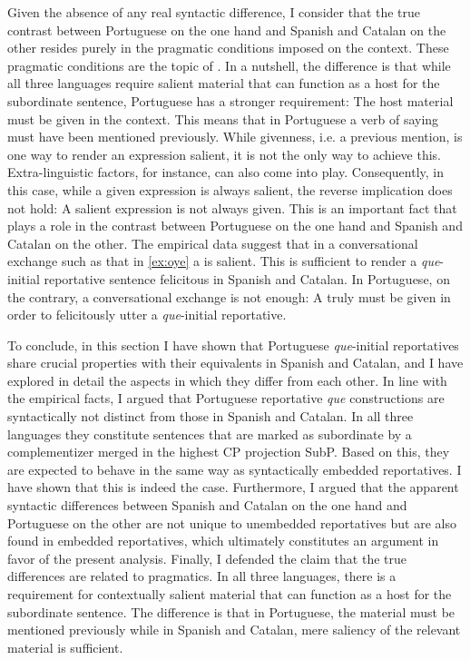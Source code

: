 Given  the absence  of any real syntactic difference, I consider that the  true contrast between Portuguese on the one hand and Spanish and Catalan on the other resides purely in the pragmatic conditions imposed on the context. These pragmatic conditions are the topic of  . In a nutshell, the difference is that while all three languages require salient material that can function as a host for the subordinate sentence, Portuguese has a stronger requirement: The host material must  be given in the context. This means that in Portuguese a verb of saying must have been mentioned previously. While givenness, i.e. a previous mention, is one way to render an expression salient, it is  not the only way to achieve this. Extra-linguistic factors, for instance,  can also come into play. Consequently, in this case, while a given expression is always salient, the reverse implication does not hold: A salient expression is not always given. This is an  important fact that plays a role in the contrast between Portuguese on the one hand and Spanish and Catalan on the other.  The empirical data suggest that  in a conversational exchange such as that in \eqref{ex:oye}  a \emph{} is salient. This  is sufficient to render a \emph{que}-initial reportative sentence felicitous in Spanish and Catalan. In Portuguese, on the contrary, a conversational exchange is not enough: A \emph{} truly must be  given in order to felicitously utter a \emph{que}-initial reportative.



To conclude, in  this section I have shown that Portuguese \emph{que}-initial reportatives share crucial properties with their equivalents in Spanish and Catalan, and I have explored in detail the aspects in which they differ from each other. In line with the empirical facts, I argued that Portuguese reportative \emph{que} constructions are syntactically not distinct from those in Spanish and Catalan. In all three languages they constitute sentences that are marked as subordinate by a complementizer merged in the highest CP projection SubP. Based on this, they are  expected  to behave in the same way as syntactically embedded reportatives. I have shown that this is indeed the case. Furthermore, I  argued that the apparent syntactic differences between Spanish and Catalan on the one hand and Portuguese on the other are not unique to unembedded reportatives  but are also found in embedded reportatives, which ultimately constitutes an argument in favor of the present analysis. Finally, I defended the claim that the true differences  are related to pragmatics. In all three languages, there is a requirement for  contextually salient  material that can function as a host for the subordinate sentence. The difference  is that in Portuguese, the material must be mentioned previously while in Spanish and Catalan, mere saliency of the relevant material is sufficient.


